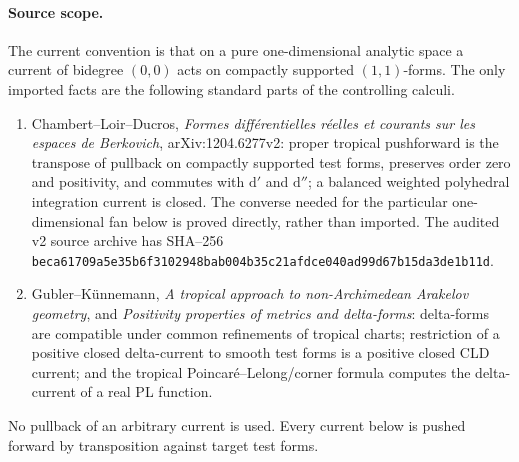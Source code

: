 
\paragraph{Source scope.}
The current convention is that on a pure one-dimensional analytic space a
current of bidegree $(0,0)$ acts on compactly supported $(1,1)$-forms.  The
only imported facts are the following standard parts of the controlling
calculi.
\begin{enumerate}
\item Chambert--Loir--Ducros, \emph{Formes diff\'erentielles r\'eelles et
courants sur les espaces de Berkovich}, arXiv:1204.6277v2: proper
tropical pushforward is the transpose of pullback on compactly supported
test forms, preserves order zero and positivity, and commutes with
$\mathrm d'$ and $\mathrm d''$; a balanced weighted polyhedral integration
current is closed.  The converse needed for the particular one-dimensional
fan below is proved directly, rather than imported.  The audited v2 source
archive has SHA--256
\texttt{beca61709a5e35b6f3102948bab004b35c21afdce040ad99d67b15da3de1b11d}.
\item Gubler--K\"unnemann, \emph{A tropical approach to non-Archimedean
Arakelov geometry}, and \emph{Positivity properties of metrics and
delta-forms}: delta-forms are compatible under common refinements of
tropical charts; restriction of a positive closed delta-current to smooth
test forms is a positive closed CLD current; and the tropical
Poincar\'e--Lelong/corner formula computes the delta-current of a real PL
function.
\end{enumerate}
No pullback of an arbitrary current is used.  Every current below is pushed
forward by transposition against target test forms.

